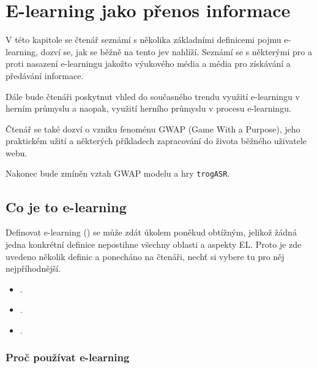 \chapter{E-learning jako přenos informace}

V této kapitole se čtenář seznámí s několika základními definicemi pojmu e-learning, dozví se, jak se běžně na tento jev nahlíží. Seznámí se s některými pro a proti nasazení e-learningu jakožto výukového média a média pro získávání a předávání informace.

Dále bude čtenáři poskytnut vhled do současného trendu využití e-learningu v herním průmyslu a naopak, využití herního průmyslu v procesu e-learningu. 

Čtenář se také dozví o vzniku fenoménu GWAP (Game With a Purpose), jeho praktickém užití a některých příkladech zapracování do života běžného uživatele webu.

Nakonec bude zmíněn vztah GWAP modelu a hry \verb|trogASR|.

\section{Co je to e-learning}

Definovat e-learning () se může zdát úkolem poněkud obtížným, jelikož žádná jedna konkrétní definice nepostihne všechny oblasti a aspekty EL. Proto je zde uvedeno několik definic a ponecháno na čtenáři, nechť si vybere tu pro něj nejpříhodnější.

\begin{itemize}
\item {} \cite{korviny_2005}.
\item {} \cite{stockley_2003}.
\item {} \cite{prucha_2009}.
\end{itemize}

\subsection{Proč používat e-learning}

